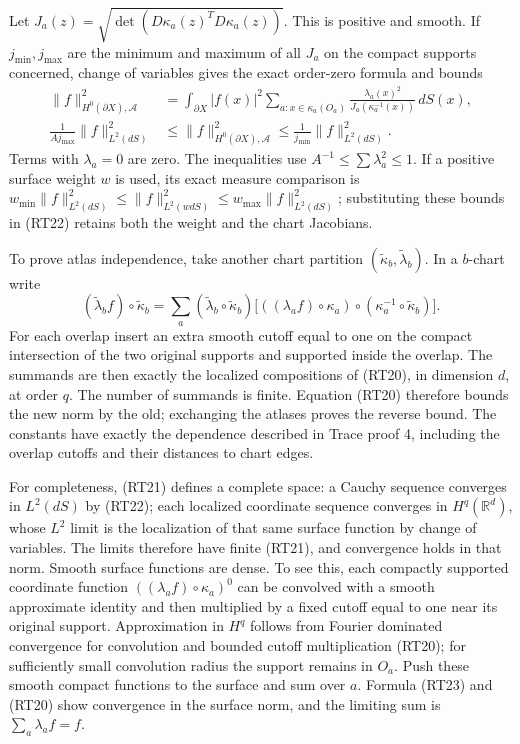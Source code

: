 \documentclass[
  11pt,
]{article}
\begin{document}
Let \(J_a(z)=\sqrt{\det(D\kappa_a(z)^TD\kappa_a(z))}\). This is positive
and smooth. If \(j_{\min},j_{\max}\) are the minimum and maximum of all
\(J_a\) on the compact supports concerned, change of variables gives the
exact order-zero formula and bounds \[
\begin{aligned}
 \|f\|_{H^0(\partial X),\mathcal A}^2
 &=\int_{\partial X}|f(x)|^2
   \sum_{a:x\in\kappa_a(O_a)}
   \frac{\lambda_a(x)^2}{J_a(\kappa_a^{-1}(x))}\,dS(x),\\
 \frac1{A j_{\max}}\|f\|_{L^2(dS)}^2
 &\leq\|f\|_{H^0(\partial X),\mathcal A}^2
 \leq\frac1{j_{\min}}\|f\|_{L^2(dS)}^2.
\end{aligned}
 \tag{RT22}
\] Terms with \(\lambda_a=0\) are zero. The inequalities use
\(A^{-1}\leq\sum\lambda_a^2\leq1\). If a positive surface weight \(w\)
is used, its exact measure comparison is
\(w_{\min}\|f\|_{L^2(dS)}^2\leq\|f\|_{L^2(wdS)}^2\leq w_{\max}\|f\|_{L^2(dS)}^2\);
substituting these bounds in (RT22) retains both the weight and the
chart Jacobians.

To prove atlas independence, take another chart partition
\((\widetilde\kappa_b,\widetilde\lambda_b)\). In a \(b\)-chart write \[
 (\widetilde\lambda_b f)\circ\widetilde\kappa_b
 =\sum_a
 (\widetilde\lambda_b\circ\widetilde\kappa_b)
 \bigl[((\lambda_a f)\circ\kappa_a)
       \circ(\kappa_a^{-1}\circ\widetilde\kappa_b)\bigr].
 \tag{RT23}
\] For each overlap insert an extra smooth cutoff equal to one on the
compact intersection of the two original supports and supported inside
the overlap. The summands are then exactly the localized compositions of
(RT20), in dimension \(d\), at order \(q\). The number of summands is
finite. Equation (RT20) therefore bounds the new norm by the old;
exchanging the atlases proves the reverse bound. The constants have
exactly the dependence described in Trace proof 4, including the overlap
cutoffs and their distances to chart edges.

For completeness, (RT21) defines a complete space: a Cauchy sequence
converges in \(L^2(dS)\) by (RT22); each localized coordinate sequence
converges in \(H^q(\mathbb R^d)\), whose \(L^2\) limit is the
localization of that same surface function by change of variables. The
limits therefore have finite (RT21), and convergence holds in that norm.
Smooth surface functions are dense. To see this, each compactly
supported coordinate function \(((\lambda_af)\circ\kappa_a)^0\) can be
convolved with a smooth approximate identity and then multiplied by a
fixed cutoff equal to one near its original support. Approximation in
\(H^q\) follows from Fourier dominated convergence for convolution and
bounded cutoff multiplication (RT20); for sufficiently small convolution
radius the support remains in \(O_a\). Push these smooth compact
functions to the surface and sum over \(a\). Formula (RT23) and (RT20)
show convergence in the surface norm, and the limiting sum is
\(\sum_a\lambda_af=f\).
\end{document}
